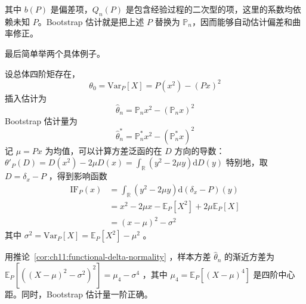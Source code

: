 其中 $b(P)$ 是偏差项，$Q_n(P)$ 是包含经验过程的二次型的项，这里的系数均依赖未知 $P$。Bootstrap 估计就是把上述 $P$ 替换为 $\mathbb{P}_n$，因而能够自动估计偏差和曲率修正。

最后简单举两个具体例子。

\begin{example}[方差]\label{ex:ch11:variance}

设总体四阶矩存在，
\[\theta_0=\mathrm{Var}_P[X]=P(x^2)-(Px)^2\]
插入估计为
\[\widehat{\theta}_n=\mathbb{P}_nx^2-(\mathbb{P}_nx)^2\]
Bootstrap 估计量为
\[\widehat{\theta}_n^*=\mathbb{P}_n^*x^2-(\mathbb{P}_n^*x)^2\]
记 $\mu=Px$ 为均值，可以计算方差泛函的在 $D$ 方向的导数： $\theta'_P(D)=D (x^2) -2\mu D (x)=\int_{\mathbb R}(y^2-2\mu y)\mathrm dD(y)$ 特别地，取 $D=\delta_x-P$ ，得到影响函数 \[ \begin{aligned} \mathrm{IF}_P(x)&=\int_{\mathbb R}(y^2-2\mu y)\mathrm d(\delta_x-P)(y)\\ &=x^2-2\mu x-\mathbb E_P[X^2]+2\mu\mathbb E_P[X]\\ &=(x-\mu)^2-\sigma^2 \end{aligned} \]其中 $\sigma^2=\mathrm{Var}_P[X]=\mathbb E_P[X^2]-\mu^2$ 。

用推论~\ref{cor:ch11:functional-delta-normality} ，样本方差 $\widehat\theta_n$ 的渐近方差为 $\mathbb E_P[((X-\mu)^2-\sigma^2)^2]=\mu_4-\sigma^4$ ，其中 $\mu_4=\mathbb E_P[(X-\mu)^4]$ 是四阶中心距。同时，Bootstrap 估计量一阶正确。


\end{example}


